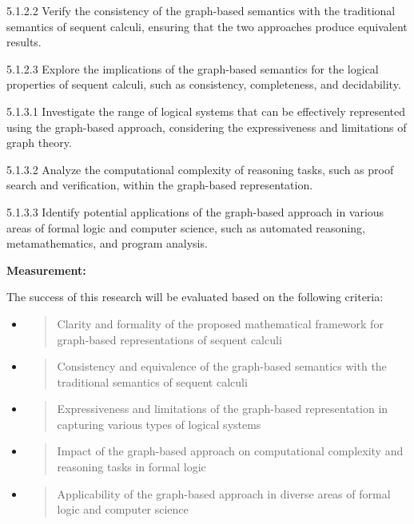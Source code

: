 5.1.2.2 Verify the consistency of the graph-based semantics with the
traditional semantics of sequent calculi, ensuring that the two
approaches produce equivalent results.

5.1.2.3 Explore the implications of the graph-based semantics for the
logical properties of sequent calculi, such as consistency,
completeness, and decidability.

5.1.3.1 Investigate the range of logical systems that can be effectively
represented using the graph-based approach, considering the
expressiveness and limitations of graph theory.

5.1.3.2 Analyze the computational complexity of reasoning tasks, such as
proof search and verification, within the graph-based representation.

5.1.3.3 Identify potential applications of the graph-based approach in
various areas of formal logic and computer science, such as automated
reasoning, metamathematics, and program analysis.

\textbf{Measurement:}

The success of this research will be evaluated based on the following
criteria:

\begin{itemize}
\item
  \begin{quote}
  Clarity and formality of the proposed mathematical framework for
  graph-based representations of sequent calculi
  \end{quote}
\item
  \begin{quote}
  Consistency and equivalence of the graph-based semantics with the
  traditional semantics of sequent calculi
  \end{quote}
\item
  \begin{quote}
  Expressiveness and limitations of the graph-based representation in
  capturing various types of logical systems
  \end{quote}
\item
  \begin{quote}
  Impact of the graph-based approach on computational complexity and
  reasoning tasks in formal logic
  \end{quote}
\item
  \begin{quote}
  Applicability of the graph-based approach in diverse areas of formal
  logic and computer science
  \end{quote}
\end{itemize}

